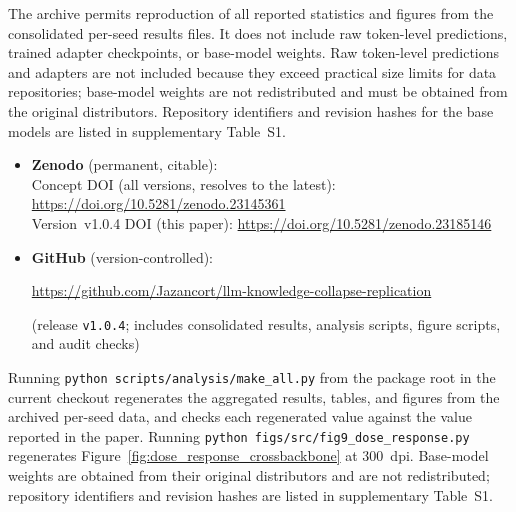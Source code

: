 \documentclass[a4paper,fleqn]{cas-dc}
\newif\ifshowchanges
\newcommand{\rev}[1]{\ifshowchanges{\color{blue}#1}\else{#1}\fi}
\begin{document}
\rev{The archive permits reproduction of all reported statistics and figures from the consolidated per-seed results files. It does not include raw token-level predictions, trained adapter checkpoints, or base-model weights. Raw token-level predictions and adapters are not included because they exceed practical size limits for data repositories; base-model weights are not redistributed and must be obtained from the original distributors. Repository identifiers and revision hashes for the base models are listed in supplementary Table~S1.}


\begin{itemize}
  \item \textbf{Zenodo} (permanent, citable):\\
    Concept DOI (all versions, resolves to the latest):
    \url{https://doi.org/10.5281/zenodo.23145361}\\
    Version~v1.0.4 DOI (this paper):
    \url{https://doi.org/10.5281/zenodo.23185146}
  \item \textbf{GitHub} (version-controlled):\\
    {\sloppy\url{https://github.com/Jazancort/llm-knowledge-collapse-replication}\par}
    (release \texttt{v1.0.4}; includes consolidated results, analysis scripts, figure scripts, and audit checks)
\end{itemize}

\rev{Running \texttt{python scripts/analysis/make\_all.py} from the package root in the current checkout regenerates the aggregated results, tables, and figures from the archived per-seed data, and checks each regenerated value against the value reported in the paper.}
Running \texttt{python figs/src/fig9\_dose\_response.py} regenerates
Figure~\ref{fig:dose_response_crossbackbone} at 300~dpi.
Base-model weights are obtained from their original distributors and are not
redistributed; repository identifiers and revision hashes are listed in supplementary
Table~S1.

\clearpage
\def\lastpage{\pageref{LastPage}}
\end{document}
